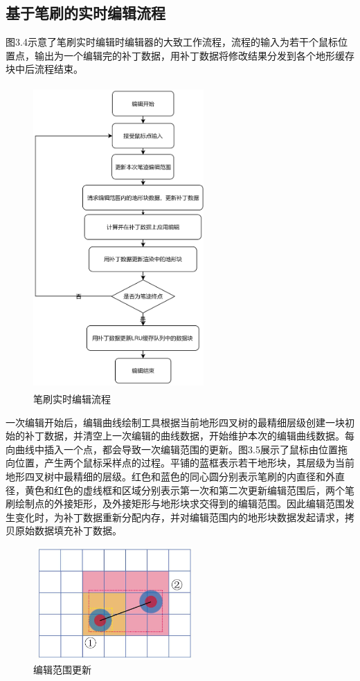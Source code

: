 \subsection{基于笔刷的实时编辑流程}
图3.4示意了笔刷实时编辑时编辑器的大致工作流程，流程的输入为若干个鼠标位置点，输出为一个编辑完的补丁数据，用补丁数据将修改结果分发到各个地形缓存块中后流程结束。\par
\begin{figure}[htbp]
\centering
\includegraphics[height=11.6cm,width=6.5cm]{figures/flowChart.png}
\caption{笔刷实时编辑流程}
\end{figure}
一次编辑开始后，编辑曲线绘制工具根据当前地形四叉树的最精细层级创建一块初始的补丁数据，并清空上一次编辑的曲线数据，开始维护本次的编辑曲线数据。每向曲线中插入一个点，都会导致一次编辑范围的更新。图3.5展示了鼠标由位置拖向位置，产生两个鼠标采样点的过程。平铺的蓝框表示若干地形块，其层级为当前地形四叉树中最精细的层级。红色和蓝色的同心圆分别表示笔刷的内直径和外直径，黄色和红色的虚线框和区域分别表示第一次和第二次更新编辑范围后，两个笔刷绘制点的外接矩形，及外接矩形与地形块求交得到的编辑范围。因此编辑范围发生变化时，为补丁数据重新分配内存，并对编辑范围内的地形块数据发起请求，拷贝原始数据填充补丁数据。\par
\begin{figure}[htbp]
\centering
\includegraphics[height=4.3cm,width=6.2cm]{figures/brushRange.jpg}
\caption{编辑范围更新}
\end{figure}
